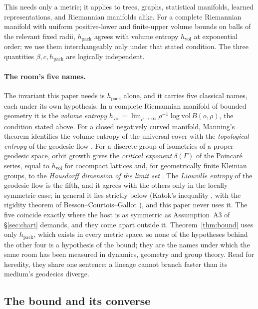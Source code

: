 \documentclass[11pt,reqno]{amsart}
\theoremstyle{plain}
\theoremstyle{definition}
\newcommand{\hpack}{h_{\mathrm{pack}}}
\newcommand{\hvol}{h_{\mathrm{vol}}}
\begin{document}
This needs only a metric; it applies to trees, graphs, statistical manifolds, learned representations, and Riemannian manifolds alike. For a complete Riemannian manifold with uniform positive-lower and finite-upper volume bounds on balls of the relevant fixed radii, $\hpack$ agrees with volume entropy $\hvol$ at exponential order; we use them interchangeably only under that stated condition. The three quantities $\beta,c,\hpack$ are logically independent.

\paragraph{The room's five names.}
The invariant this paper needs is $\hpack$ alone, and it carries five classical names, each under its own
hypothesis. In a complete Riemannian manifold of bounded geometry it is the \emph{volume entropy}
$\hvol=\lim_{\rho\to\infty}\rho^{-1}\log\mathrm{vol}\,B(o,\rho)$, the condition stated above. For a closed negatively
curved manifold, Manning's theorem identifies the volume entropy of the universal cover with the \emph{topological
entropy} of the geodesic flow \cite{manning1979}. For a discrete group of isometries of a proper geodesic space, orbit
growth gives the \emph{critical exponent} $\delta(\Gamma)$ of the Poincar\'e series, equal to $\hvol$ for cocompact
lattices \cite{patterson1976,sullivan1979} and, for geometrically finite Kleinian groups, to the \emph{Hausdorff
dimension of the limit set} \cite{bishopjones1997}. The \emph{Liouville entropy} of the geodesic flow is the fifth, and
it agrees with the others only in the locally symmetric case; in general it lies strictly below (Katok's inequality
\cite{katok1982}, with the rigidity theorem of Besson--Courtois--Gallot \cite{bcg1995}), and this paper never uses
it. The five coincide exactly where the host is as symmetric as Assumption~A3 of \S\ref{sec:chart} demands, and they
come apart outside it. Theorem~\ref{thm:bound} uses only $\hpack$, which exists in every metric space, so none of the
hypotheses behind the other four is a hypothesis of the bound; they are the names under which the same room has been
measured in dynamics, geometry and group theory. Read for heredity, they share one sentence: a lineage cannot branch
faster than its medium's geodesics diverge.

\subsection{The bound and its converse}
\end{document}
